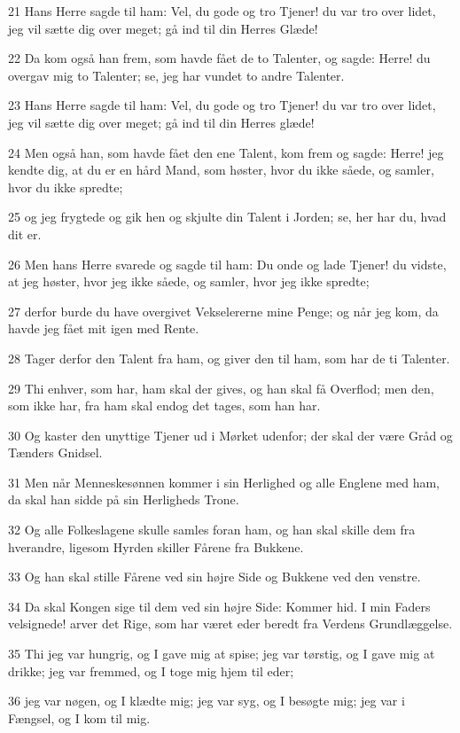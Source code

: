 \par 21 Hans Herre sagde til ham: Vel, du gode og tro Tjener! du var tro over lidet, jeg vil sætte dig over meget; gå ind til din Herres Glæde!
\par 22 Da kom også han frem, som havde fået de to Talenter, og sagde: Herre! du overgav mig to Talenter; se, jeg har vundet to andre Talenter.
\par 23 Hans Herre sagde til ham: Vel, du gode og tro Tjener! du var tro over lidet, jeg vil sætte dig over meget; gå ind til din Herres glæde!
\par 24 Men også han, som havde fået den ene Talent, kom frem og sagde: Herre! jeg kendte dig, at du er en hård Mand, som høster, hvor du ikke såede, og samler, hvor du ikke spredte;
\par 25 og jeg frygtede og gik hen og skjulte din Talent i Jorden; se, her har du, hvad dit er.
\par 26 Men hans Herre svarede og sagde til ham: Du onde og lade Tjener! du vidste, at jeg høster, hvor jeg ikke såede, og samler, hvor jeg ikke spredte;
\par 27 derfor burde du have overgivet Vekselererne mine Penge; og når jeg kom, da havde jeg fået mit igen med Rente.
\par 28 Tager derfor den Talent fra ham, og giver den til ham, som har de ti Talenter.
\par 29 Thi enhver, som har, ham skal der gives, og han skal få Overflod; men den, som ikke har, fra ham skal endog det tages, som han har.
\par 30 Og kaster den unyttige Tjener ud i Mørket udenfor; der skal der være Gråd og Tænders Gnidsel.
\par 31 Men når Menneskesønnen kommer i sin Herlighed og alle Englene med ham, da skal han sidde på sin Herligheds Trone.
\par 32 Og alle Folkeslagene skulle samles foran ham, og han skal skille dem fra hverandre, ligesom Hyrden skiller Fårene fra Bukkene.
\par 33 Og han skal stille Fårene ved sin højre Side og Bukkene ved den venstre.
\par 34 Da skal Kongen sige til dem ved sin højre Side: Kommer hid. I min Faders velsignede! arver det Rige, som har været eder beredt fra Verdens Grundlæggelse.
\par 35 Thi jeg var hungrig, og I gave mig at spise; jeg var tørstig, og I gave mig at drikke; jeg var fremmed, og I toge mig hjem til eder;
\par 36 jeg var nøgen, og I klædte mig; jeg var syg, og I besøgte mig; jeg var i Fængsel, og I kom til mig.
